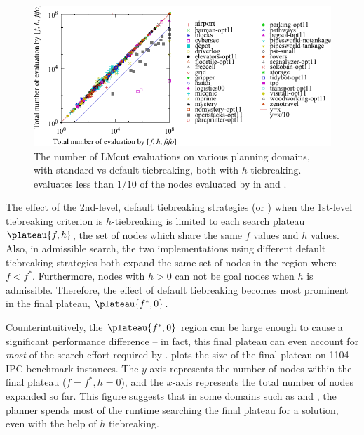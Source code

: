 \begin{figure}[htbp]
 \centering {}
 \includegraphics{tables/aaai16-30min-5min-cut/aaai16prelim3/evaluated-lmcut_ff-lmcut_lf.pdf}
 \caption{The number of LMcut evaluations on various planning domains,
 with standard \fifo vs \lifo default tiebreaking, both with $h$
 tiebreaking. \lifo evaluates  less than $1/10$ of the nodes evaluated
 by \fifo in  and . 
 }
 \label{fig:f-h-eval}
\end{figure}

The effect of the 2nd-level, default tiebreaking strategies (\lifo or
\fifo)  when the 1st-level tiebreaking criterion is  $h$-tiebreaking is
limited to each search plateau $\plateau{f,h}$, the set of nodes which
share the same $f$ values and $h$ values.
% 
Also, in admissible search, the two \astar implementations using 
different default tiebreaking strategies both expand the same set of
nodes in the region where $f<f^*$.
% 
Furthermore, nodes with $h>0$ can not be goal nodes when $h$ is admissible.
% 
Therefore, the effect of default tiebreaking becomes most prominent in the final plateau, $\plateau{f^*,0}$.

Counterintuitively, the $\plateau{f^*, 0}$ region can be large enough to
cause a significant performance difference -- in fact, this final plateau can even account for \emph{most} of the
search effort required by \astar.
 plots the size of the final plateau on 1104 IPC
benchmark instances.  The $y$-axis represents the number of nodes within
the final plateau ($f=f^*, h=0$), and the $x$-axis represents the total
number of nodes expanded so far. This figure suggests that in some
domains such as  and , the planner
spends most of the runtime searching the final plateau for a solution,
even with the help of $h$ tiebreaking.

